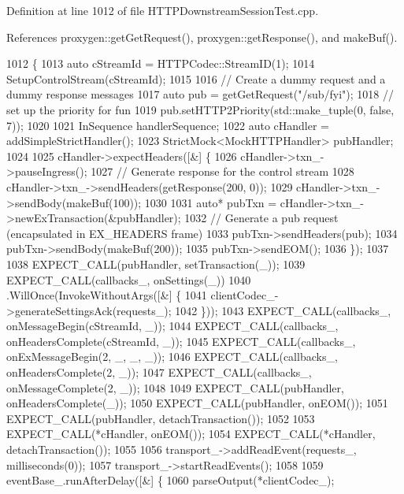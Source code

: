 Definition at line 1012 of file H\+T\+T\+P\+Downstream\+Session\+Test.\+cpp.



References proxygen\+::get\+Get\+Request(), proxygen\+::get\+Response(), and make\+Buf().


\begin{DoxyCode}
1012                                                        \{
1013   \textcolor{keyword}{auto} cStreamId = HTTPCodec::StreamID(1);
1014   SetupControlStream(cStreamId);
1015 
1016   \textcolor{comment}{// Create a dummy request and a dummy response messages}
1017   \textcolor{keyword}{auto} pub = getGetRequest(\textcolor{stringliteral}{"/sub/fyi"});
1018   \textcolor{comment}{// set up the priority for fun}
1019   pub.setHTTP2Priority(std::make\_tuple(0, \textcolor{keyword}{false}, 7));
1020 
1021   InSequence handlerSequence;
1022   \textcolor{keyword}{auto} cHandler = addSimpleStrictHandler();
1023   StrictMock<MockHTTPHandler> pubHandler;
1024 
1025   cHandler->expectHeaders([&] \{
1026       cHandler->txn\_->pauseIngress();
1027       \textcolor{comment}{// Generate response for the control stream}
1028       cHandler->txn\_->sendHeaders(getResponse(200, 0));
1029       cHandler->txn\_->sendBody(makeBuf(100));
1030 
1031       \textcolor{keyword}{auto}* pubTxn = cHandler->txn\_->newExTransaction(&pubHandler);
1032       \textcolor{comment}{// Generate a pub request (encapsulated in EX\_HEADERS frame)}
1033       pubTxn->sendHeaders(pub);
1034       pubTxn->sendBody(makeBuf(200));
1035       pubTxn->sendEOM();
1036     \});
1037 
1038   EXPECT\_CALL(pubHandler, setTransaction(\_));
1039   EXPECT\_CALL(callbacks\_, onSettings(\_))
1040     .WillOnce(InvokeWithoutArgs([&] \{
1041           clientCodec\_->generateSettingsAck(requests\_);
1042         \}));
1043   EXPECT\_CALL(callbacks\_, onMessageBegin(cStreamId, \_));
1044   EXPECT\_CALL(callbacks\_, onHeadersComplete(cStreamId, \_));
1045   EXPECT\_CALL(callbacks\_, onExMessageBegin(2, \_, \_, \_));
1046   EXPECT\_CALL(callbacks\_, onHeadersComplete(2, \_));
1047   EXPECT\_CALL(callbacks\_, onMessageComplete(2, \_));
1048 
1049   EXPECT\_CALL(pubHandler, onHeadersComplete(\_));
1050   EXPECT\_CALL(pubHandler, onEOM());
1051   EXPECT\_CALL(pubHandler, detachTransaction());
1052 
1053   EXPECT\_CALL(*cHandler, onEOM());
1054   EXPECT\_CALL(*cHandler, detachTransaction());
1055 
1056   transport\_->addReadEvent(requests\_, milliseconds(0));
1057   transport\_->startReadEvents();
1058 
1059   eventBase\_.runAfterDelay([&] \{
1060       parseOutput(*clientCodec\_);

\end{DoxyCode}

